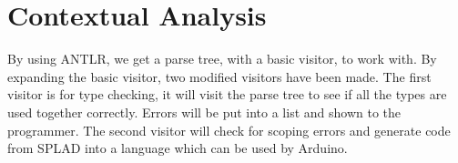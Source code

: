 \section{Contextual Analysis}
\label{sec:contextual}
By using ANTLR, we get a parse tree, with a basic visitor, to work with. By expanding the basic visitor, two modified visitors have been made. The first visitor is for type checking, it will visit the parse tree to see if all the types are used together correctly. Errors will be put into a list and shown to the programmer. The second visitor will check for scoping errors and generate code from SPLAD into a language which can be used by Arduino.